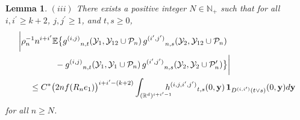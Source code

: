 \documentclass[11pt]{amsart}
\numberwithin{equation}{section}
\theoremstyle{plain}
\newtheorem{lemma}[theorem]{Lemma}
\theoremstyle{definition}
\begin{document}
\begin{lemma}
\noindent $(iii)$ There exists a positive integer $N \in {{\mathbb N}}_+$ such that for all $i, {i^{\prime}} \geq k+2$, $j, {j^{\prime}} \geq 1$, and $t,s \geq 0$,
\begin{align*}
\biggl| &\rho_n^{-1} n^{i+{i^{\prime}}} {\mathbb{E}} \bigl\{  {g^{(i,j)}}_{n,t}({{\mathcal{Y}}}_1, {{\mathcal{Y}}}_{12} \cup {\mathcal P_n})\, {g^{(i^{\prime},j^{\prime})}}_{n,s}({{\mathcal{Y}}}_2, {{\mathcal{Y}}}_{12} \cup {\mathcal P_n}) \\
&\qquad \qquad - {g^{(i,j)}}_{n,t}({{\mathcal{Y}}}_1, {{\mathcal{Y}}}_1 \cup {\mathcal P_n})\, {g^{(i^{\prime},j^{\prime})}}_{n,s} ({{\mathcal{Y}}}_2, {{\mathcal{Y}}}_2 \cup {\mathcal P_n^{\prime}}) \bigr\}  \biggr| \\
&\quad \leq C^* \bigl( 2nf(R_ne_1) \bigr)^{i+{i^{\prime}}-(k+2)} \int_{({{\mathbb R}}^d)^{i+{i^{\prime}}-1}} \hspace{-10pt} {h^{(i, j, i^{\prime}, j^{\prime})}}_{t,s} (0,{{\bf y}})\,{{\bf 1}}_{{D^{(i,{i^{\prime}})}}(t\vee s)}(0,{{\bf y}})d{{\bf y}}
\end{align*}
for all $n \geq N$.
\end{lemma}
\end{document}
